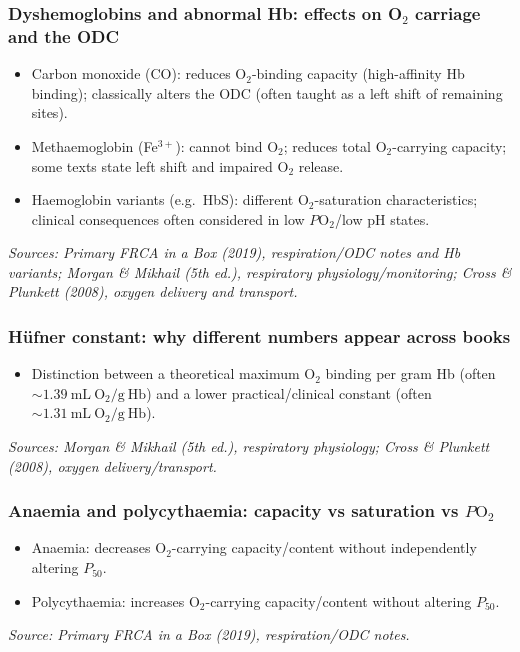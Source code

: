 \documentclass[11pt,a4paper]{article}
\begin{document}
\subsubsection{Dyshemoglobins and abnormal Hb: effects on O\(_2\) carriage and the ODC}
\begin{itemize}
  \item Carbon monoxide (CO): reduces O\(_2\)-binding capacity (high-affinity Hb binding); classically alters the ODC (often taught as a left shift of remaining sites).
  \item Methaemoglobin (Fe\(^{3+}\)): cannot bind O\(_2\); reduces total O\(_2\)-carrying capacity; some texts state left shift and impaired O\(_2\) release.
  \item Haemoglobin variants (e.g.\ HbS): different O\(_2\)-saturation characteristics; clinical consequences often considered in low \(P\mathrm{O}_2\)/low pH states.
\end{itemize}
\textit{Sources: Primary FRCA in a Box (2019), respiration/ODC notes and Hb variants; Morgan \& Mikhail (5th ed.), respiratory physiology/monitoring; Cross \& Plunkett (2008), oxygen delivery and transport.}

\subsubsection{Hüfner constant: why different numbers appear across books}
\begin{itemize}
  \item Distinction between a theoretical maximum O\(_2\) binding per gram Hb (often \(\sim 1.39~\mathrm{mL~O_2/g~Hb}\)) and a lower practical/clinical constant (often \(\sim 1.31~\mathrm{mL~O_2/g~Hb}\)).
\end{itemize}
\textit{Sources: Morgan \& Mikhail (5th ed.), respiratory physiology; Cross \& Plunkett (2008), oxygen delivery/transport.}

\subsubsection{Anaemia and polycythaemia: capacity vs saturation vs \(P\mathrm{O}_2\)}
\begin{itemize}
  \item Anaemia: decreases O\(_2\)-carrying capacity/content without independently altering \(P_{50}\).
  \item Polycythaemia: increases O\(_2\)-carrying capacity/content without altering \(P_{50}\).
\end{itemize}
\textit{Source: Primary FRCA in a Box (2019), respiration/ODC notes.}
\end{document}
